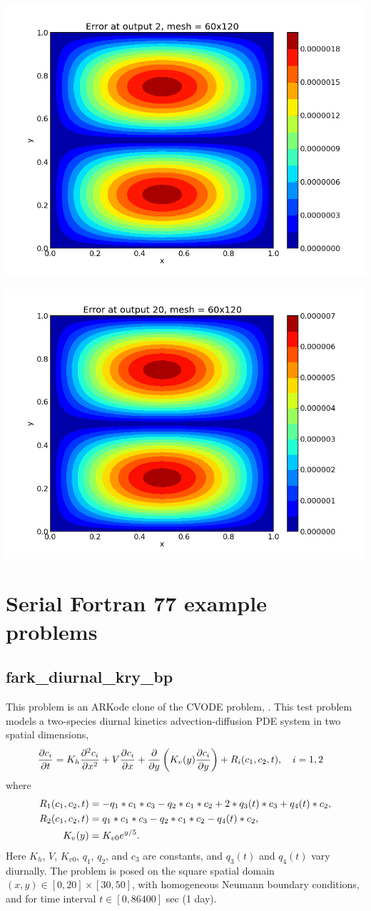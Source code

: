 \documentclass[letterpaper,10pt,english]{sphinxmanual}
\begin{document}
\includegraphics[width=0.300\linewidth]{plot-ark_heat2d_err_2.png}

\includegraphics[width=0.300\linewidth]{plot-ark_heat2d_err_3.png}


\chapter{Serial Fortran 77 example problems}
\label{f77_serial:serial-fortran-77-example-problems}\label{f77_serial::doc}\label{f77_serial:serial-f77}

\section{fark\_diurnal\_kry\_bp}
\label{f77_serial:fark-diurnal-kry-bp}\label{f77_serial:id1}
This problem is an ARKode clone of the CVODE problem,
.  This test problem models a two-species
diurnal kinetics advection-diffusion PDE system in two spatial
dimensions,
\begin{gather}
\begin{split}\frac{\partial c_i}{\partial t} &=
  K_h \frac{\partial^2 c_i}{\partial x^2} +
  V \frac{\partial     c_i}{\partial x} +
  \frac{\partial}{\partial y}\left( K_v(y)
  \frac{\partial c_i}{\partial y}\right) +
  R_i(c_1,c_2,t),\quad i=1,2\end{split}\notag
\end{gather}
where
\begin{gather}
\begin{split}R_1(c_1,c_2,t) &= -q_1*c_1*c_3 - q_2*c_1*c_2 + 2*q_3(t)*c_3 + q_4(t)*c_2, \\
R_2(c_1,c_2,t) &=  q_1*c_1*c_3 - q_2*c_1*c_2 - q_4(t)*c_2, \\
K_v(y) &= K_{v0} e^{y/5}.\end{split}\notag
\end{gather}
Here \(K_h\), \(V\), \(K_{v0}\), \(q_1\), \(q_2\),
and \(c_3\) are constants, and \(q_3(t)\) and \(q_4(t)\)
vary diurnally.  The problem is posed on the square spatial domain
\((x,y) \in [0,20]\times[30,50]\), with homogeneous Neumann
boundary conditions, and for time interval \(t\in [0,86400]\) sec
(1 day).
\end{document}
